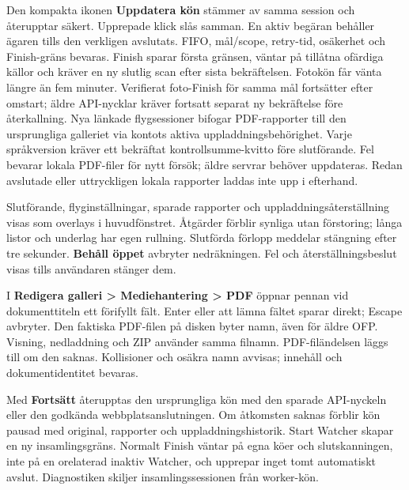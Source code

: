\documentclass[11pt,a4paper]{article}
\newcommand{\ui}[1]{\textbf{#1}}
\begin{document}
Den kompakta ikonen \ui{Uppdatera kön} stämmer av samma session och återupptar
säkert. Upprepade klick slås samman. En aktiv begäran behåller ägaren tills
den verkligen avslutats. FIFO, mål/scope, retry-tid, osäkerhet och Finish-gräns
bevaras. Finish sparar första gränsen, väntar på tillåtna ofärdiga källor
och kräver en ny slutlig scan efter sista bekräftelsen. Fotokön får vänta
längre än fem minuter. Verifierat foto-Finish för samma mål fortsätter efter
omstart; äldre API-nycklar kräver fortsatt separat ny bekräftelse före
återkallning. Nya länkade flygsessioner bifogar PDF-rapporter till den ursprungliga galleriet
via kontots aktiva uppladdningsbehörighet. Varje språkversion kräver ett
bekräftat kontrollsumme-kvitto före slutförande. Fel bevarar lokala PDF-filer
för nytt försök; äldre servrar behöver uppdateras. Redan avslutade eller
uttryckligen lokala rapporter laddas inte upp i efterhand.

Slutförande, flyginställningar, sparade rapporter och uppladdningsåterställning
visas som overlays i huvudfönstret. Åtgärder förblir synliga utan förstoring;
långa listor och underlag har egen rullning. Slutförda förlopp meddelar
stängning efter tre sekunder. \ui{Behåll öppet} avbryter nedräkningen.
Fel och återställningsbeslut visas tills användaren stänger dem.

I \ui{Redigera galleri > Mediehantering > PDF} öppnar pennan vid dokumenttiteln
ett förifyllt fält. Enter eller att lämna fältet sparar direkt; Escape avbryter.
Den faktiska PDF-filen på disken byter namn, även för äldre OFP. Visning,
nedladdning och ZIP använder samma filnamn. PDF-filändelsen läggs till om den
saknas. Kollisioner och osäkra namn avvisas; innehåll och dokumentidentitet
bevaras.

Med \ui{Fortsätt} återupptas den ursprungliga kön med den sparade API-nyckeln
eller den godkända webbplatsanslutningen. Om åtkomsten saknas förblir kön
pausad med original, rapporter och uppladdningshistorik. Start Watcher skapar en ny
insamlingsgräns. Normalt Finish väntar på egna köer och slutskanningen,
inte på en orelaterad inaktiv Watcher, och upprepar inget tomt automatiskt
avslut. Diagnostiken skiljer insamlingssessionen från worker-kön.
\end{document}
